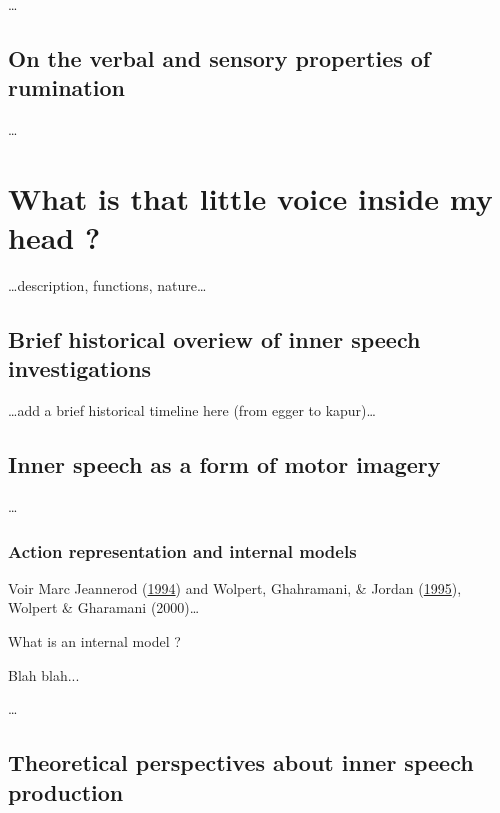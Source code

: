 \documentclass[a4paper,12pt,twoside,openright,oldfontcommands]{memoir}
\begin{document}
\ldots{}

\subsection{On the verbal and sensory properties of
rumination}\label{on-the-verbal-and-sensory-properties-of-rumination}

\ldots{}

\section{What is that little voice inside my head
?}\label{what-is-that-little-voice-inside-my-head}

\ldots{}description, functions, nature\ldots{}

\subsection{Brief historical overiew of inner speech
investigations}\label{brief-historical-overiew-of-inner-speech-investigations}

\ldots{}add a brief historical timeline here (from egger to
kapur)\ldots{}

\subsection{Inner speech as a form of motor
imagery}\label{inner-speech-as-a-form-of-motor-imagery}

\ldots{}

\subsubsection{Action representation and internal
models}\label{action-representation-and-internal-models}

Voir Marc Jeannerod
(\protect\hyperlink{ref-jeannerod_representing_1994}{1994}) and Wolpert,
Ghahramani, \& Jordan
(\protect\hyperlink{ref-wolpert_internal_1995}{1995}), Wolpert \&
Gharamani (2000)\ldots{}

\vspace{2mm}

\begin{mybox}[label = model]{What is an internal model ?}

Blah blah...

\end{mybox}

\ldots{}

\subsection{Theoretical perspectives about inner speech
production}\label{theoretical-perspectives-about-inner-speech-production}
\end{document}
